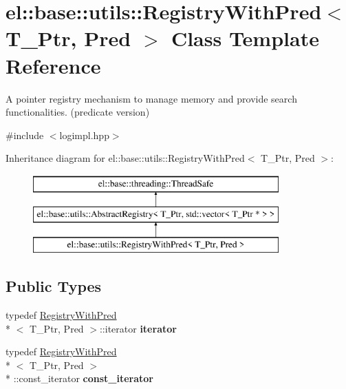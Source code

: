 \hypertarget{classel_1_1base_1_1utils_1_1RegistryWithPred}{\section{el\-:\-:base\-:\-:utils\-:\-:Registry\-With\-Pred$<$ T\-\_\-\-Ptr, Pred $>$ Class Template Reference}
\label{classel_1_1base_1_1utils_1_1RegistryWithPred}
}


A pointer registry mechanism to manage memory and provide search functionalities. (predicate version)  




{\ttfamily \#include $<$logimpl.\-hpp$>$}

Inheritance diagram for el\-:\-:base\-:\-:utils\-:\-:Registry\-With\-Pred$<$ T\-\_\-\-Ptr, Pred $>$\-:\begin{figure}[H]
\begin{center}
\leavevmode
\includegraphics[height=3.000000cm]{classel_1_1base_1_1utils_1_1RegistryWithPred}
\end{center}
\end{figure}
\subsection*{Public Types}
\begin{DoxyCompactItemize}
\item 
\hypertarget{classel_1_1base_1_1utils_1_1RegistryWithPred_afc03d2d0a72f5ebf03e1e3b37bd9932d}{typedef \hyperlink{classel_1_1base_1_1utils_1_1RegistryWithPred}{Registry\-With\-Pred}\\*
$<$ T\-\_\-\-Ptr, Pred $>$\-::iterator {\bfseries iterator}}\label{classel_1_1base_1_1utils_1_1RegistryWithPred_afc03d2d0a72f5ebf03e1e3b37bd9932d}

\item 
\hypertarget{classel_1_1base_1_1utils_1_1RegistryWithPred_ad9af7a8eeedd58a75eb70bccb334f6dc}{typedef \hyperlink{classel_1_1base_1_1utils_1_1RegistryWithPred}{Registry\-With\-Pred}\\*
$<$ T\-\_\-\-Ptr, Pred $>$\\*
\-::const\-\_\-iterator {\bfseries const\-\_\-iterator}}\label{classel_1_1base_1_1utils_1_1RegistryWithPred_ad9af7a8eeedd58a75eb70bccb334f6dc}

\end{DoxyCompactItemize}
